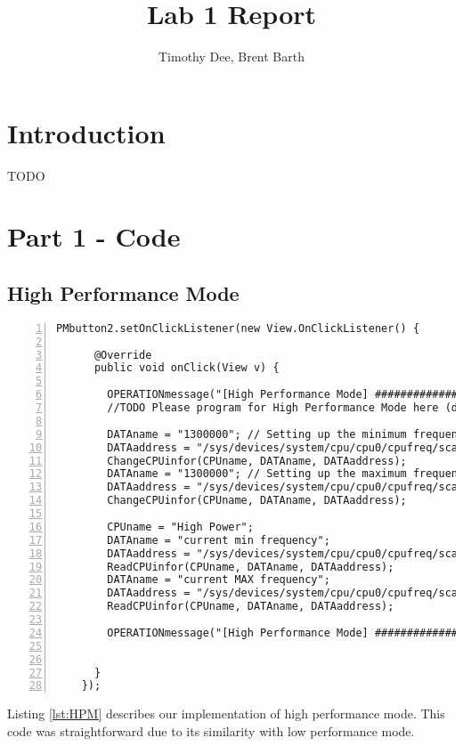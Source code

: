 \documentclass{article} %
\author{Timothy Dee, Brent Barth}
\title{Lab 1 Report}
\begin{document}
\twocolumn
\thispagestyle{empty}   %
\maketitle      %



\section{Introduction}
TODO

\section{Part 1 - Code}
\subsection{High Performance Mode}
\begin{lstlisting}[float=*, caption={High Performance Mode},label={lst:HPM},numbers=left]
PMbutton2.setOnClickListener(new View.OnClickListener() {

      @Override
      public void onClick(View v) {

        OPERATIONmessage("[High Performance Mode] ###########################################");
        //TODO Please program for High Performance Mode here (done)

        DATAname = "1300000"; // Setting up the minimum frequency 1300 Mhz
        DATAaddress = "/sys/devices/system/cpu/cpu0/cpufreq/scaling_min_freq";
        ChangeCPUinfor(CPUname, DATAname, DATAaddress);
        DATAname = "1300000"; // Setting up the maximum frequency at 1300 MHz
        DATAaddress = "/sys/devices/system/cpu/cpu0/cpufreq/scaling_max_freq";
        ChangeCPUinfor(CPUname, DATAname, DATAaddress);

        CPUname = "High Power";
        DATAname = "current min frequency";
        DATAaddress = "/sys/devices/system/cpu/cpu0/cpufreq/scaling_min_freq";
        ReadCPUinfor(CPUname, DATAname, DATAaddress);
        DATAname = "current MAX frequency";
        DATAaddress = "/sys/devices/system/cpu/cpu0/cpufreq/scaling_max_freq";
        ReadCPUinfor(CPUname, DATAname, DATAaddress);

        OPERATIONmessage("[High Performance Mode] ###########################################");


      }
    });
\end{lstlisting}
Listing \ref{lst:HPM} describes our implementation of high performance mode. This code was straightforward due to its similarity with low performance mode.
\end{document}
